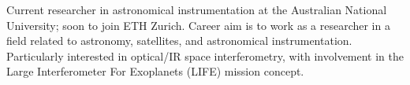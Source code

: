 

\begin{cvparagraph}

Current researcher in astronomical instrumentation at the Australian National University; soon to join ETH Zurich. Career aim is to work as a researcher in a field related to astronomy, satellites, and astronomical instrumentation. Particularly interested in optical/IR space interferometry, with involvement in the Large Interferometer For Exoplanets (LIFE) mission concept. 
\end{cvparagraph}
